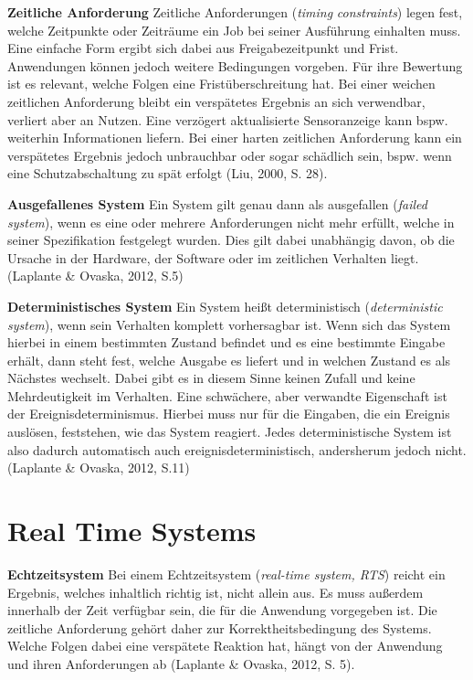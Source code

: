 \textbf{Zeitliche Anforderung} Zeitliche Anforderungen (\emph{timing} \emph{constraints}) legen fest, welche Zeitpunkte oder Zeiträume ein Job bei seiner Ausführung einhalten muss. Eine einfache Form ergibt sich dabei aus Freigabezeitpunkt und Frist. Anwendungen können jedoch weitere Bedingungen vorgeben. Für ihre Bewertung ist es relevant, welche Folgen eine Fristüberschreitung hat. Bei einer weichen zeitlichen Anforderung bleibt ein verspätetes Ergebnis an sich verwendbar, verliert aber an Nutzen. Eine verzögert aktualisierte Sensoranzeige kann bspw. weiterhin Informationen liefern. Bei einer harten zeitlichen Anforderung kann ein verspätetes Ergebnis jedoch unbrauchbar oder sogar schädlich sein, bspw. wenn eine Schutzabschaltung zu spät erfolgt (Liu, 2000, S. 28).

\textbf{Ausgefallenes System} Ein System gilt genau dann als ausgefallen (\emph{failed} \emph{system}), wenn es eine oder mehrere Anforderungen nicht mehr erfüllt, welche in seiner Spezifikation festgelegt wurden. Dies gilt dabei unabhängig davon, ob die Ursache in der Hardware, der Software oder im zeitlichen Verhalten liegt. (Laplante \& Ovaska, 2012, S.5)

\textbf{Deterministisches System }Ein System heißt deterministisch (\emph{deterministic} \emph{system}), wenn sein Verhalten komplett vorhersagbar ist. Wenn sich das System hierbei in einem bestimmten Zustand befindet und es eine bestimmte Eingabe erhält, dann steht fest, welche Ausgabe es liefert und in welchen Zustand es als Nächstes wechselt. Dabei gibt es in diesem Sinne keinen Zufall und keine Mehrdeutigkeit im Verhalten. Eine schwächere, aber verwandte Eigenschaft ist der Ereignisdeterminismus. Hierbei muss nur für die Eingaben, die ein Ereignis auslösen, feststehen, wie das System reagiert. Jedes deterministische System ist also dadurch automatisch auch ereignisdeterministisch, andersherum jedoch nicht. (Laplante \& Ovaska, 2012, S.11)

\section{Real Time Systems}
\textbf{Echtzeitsystem} Bei einem Echtzeitsystem (\emph{real-time system, RTS}) reicht ein Ergebnis, welches inhaltlich richtig ist, nicht allein aus. Es muss außerdem innerhalb der Zeit verfügbar sein, die für die Anwendung vorgegeben ist. Die zeitliche Anforderung gehört daher zur Korrektheitsbedingung des Systems. Welche Folgen dabei eine verspätete Reaktion hat, hängt von der Anwendung und ihren Anforderungen ab (Laplante \& Ovaska, 2012, S. 5).

